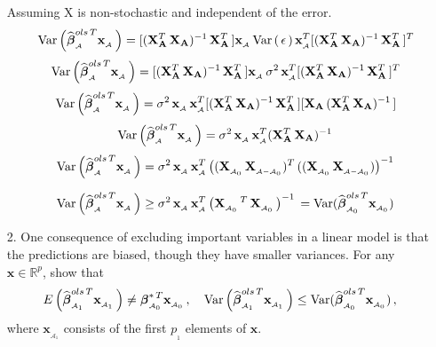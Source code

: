 \documentclass[11pt]{report}
\newcommand{\bfmath}[1]{\mbox{\boldmath$#1$\unboldmath}}
\begin{document}
\begin{enumerate}
Assuming X is non-stochastic and independent of the error.
$$ \quad \text{Var}\left( \widehat{\bfmath{\beta}}^{ols\,T}_{_\mathcal{A}}\mathbf{x}_{_\mathcal{A}}\,\right)=  [(\mathbf{X}^{T}_{\mathbf{A}}\,\mathbf{X}_{\mathbf{A}})^{-1}\,\mathbf{X}^{T}_{\mathbf{A}}\,]\mathbf{x}_{_\mathcal{A}}\,\text{Var}\left(\,\mathbf{\epsilon}\, \right)\mathbf{x}^{T}_{_\mathcal{A}}[(\mathbf{X}^{T}_{\mathbf{A}}\,\mathbf{X}_{\mathbf{A}})^{-1}\,\mathbf{X}^{T}_{\mathbf{A}}\,]^{T}$$
$$ \quad \text{Var}\left( \widehat{\bfmath{\beta}}^{ols\,T}_{_\mathcal{A}}\mathbf{x}_{_\mathcal{A}}\,\right)=  [(\mathbf{X}^{T}_{\mathbf{A}}\,\mathbf{X}_{\mathbf{A}})^{-1}\,\mathbf{X}^{T}_{\mathbf{A}}\,]\mathbf{x}_{_\mathcal{A}}\,\mathbf{\sigma}^{2}\,\mathbf{x}^{T}_{_\mathcal{A}}[(\mathbf{X}^{T}_{\mathbf{A}}\,\mathbf{X}_{\mathbf{A}})^{-1}\,\mathbf{X}^{T}_{\mathbf{A}}\,]^{T}$$
$$ \quad \text{Var}\left( \widehat{\bfmath{\beta}}^{ols\,T}_{_\mathcal{A}}\mathbf{x}_{_\mathcal{A}}\,\right)=  \mathbf{\sigma}^{2}\,\mathbf{x}_{_\mathcal{A}}\,\mathbf{x}^{T}_{_\mathcal{A}}[(\mathbf{X}^{T}_{\mathbf{A}}\,\mathbf{X}_{\mathbf{A}})^{-1}\,\mathbf{X}^{T}_{\mathbf{A}}\,][\mathbf{X}_{\mathbf{A}}\,(\mathbf{X}^{T}_{\mathbf{A}}\,\mathbf{X}_{\mathbf{A}})^{-1}\,]$$
$$ \quad \text{Var}\left( \widehat{\bfmath{\beta}}^{ols\,T}_{_\mathcal{A}}\mathbf{x}_{_\mathcal{A}}\,\right)=  \mathbf{\sigma}^{2}\,\mathbf{x}_{_\mathcal{A}}\,\mathbf{x}^{T}_{_\mathcal{A}}(\mathbf{X}^{T}_{\mathbf{A}}\,\mathbf{X}_{\mathbf{A}})^{-1}\,$$
$$ \quad \text{Var}\left( \widehat{\bfmath{\beta}}^{ols\,T}_{_\mathcal{A}}\mathbf{x}_{_\mathcal{A}}\,\right)=  \mathbf{\sigma}^{2}\,\mathbf{x}_{_\mathcal{A}}\,\mathbf{x}^{T}_{_\mathcal{A}}\left((\mathbf{X}_{_{\mathcal{A}_0}}\,\mathbf{X}_{_{\mathcal{A}-\mathcal{A}_0}})^{T}\,((\mathbf{X}_{_{\mathcal{A}_0}}\,\mathbf{X}_{_{\mathcal{A}-\mathcal{A}_0}} )\right)^{-1}\,$$

$$ \quad \text{Var}\left( \widehat{\bfmath{\beta}}^{ols\,T}_{_\mathcal{A}}\mathbf{x}_{_\mathcal{A}}\,\right)\geq  \mathbf{\sigma}^{2}\,\mathbf{x}_{_\mathcal{A}}\,\mathbf{x}^{T}_{_\mathcal{A}}\left(\mathbf{X}_{_{\mathcal{A}_0}}\,^{T}\,\mathbf{X}_{_{\mathcal{A}_0}}\,\right)^{-1}\, =  \text{Var}(\widehat{\bfmath{\beta}}^{ols\,T}_{_{\mathcal{A}_0}}\mathbf{x}_{_{\mathcal{A}_0}})\,$$


\item[2. ] One consequence of excluding important variables in a linear model is that the predictions are biased, though they have smaller variances. For any $\mathbf{x}\in\mathbb{R}^p$, show that
$$E\left( \widehat{\bfmath{\beta}}^{ols\,T}_{_{\mathcal{A}_1}}\mathbf{x}_{_{\mathcal{A}_1}}\,\right)\neq\bfmath{\beta}^{\ast\,T}_{_{\mathcal{A}_0}}\mathbf{x}_{_{\mathcal{A}_0}}\,,\quad \text{Var}\left( \widehat{\bfmath{\beta}}^{ols\,T}_{_{\mathcal{A}_1}}\mathbf{x}_{_{\mathcal{A}_1}}\,\right)\leq \text{Var}(\widehat{\bfmath{\beta}}^{ols\,T}_{_{\mathcal{A}_0}}\mathbf{x}_{_{\mathcal{A}_0}})\,,$$
where $\mathbf{x}_{_{\mathcal{A}_1}}$ consists of the first $p_{_1}$ elements of $\mathbf{x}$.


\end{enumerate}
\end{document}
